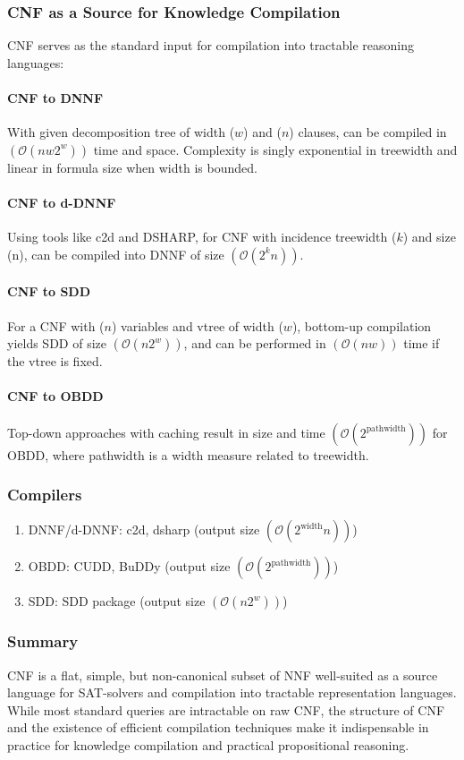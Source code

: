 \subsubsection{CNF as a Source for Knowledge Compilation}
CNF serves as the standard input for compilation into tractable reasoning languages:

\paragraph{CNF to DNNF}
With given decomposition tree of width ($w$) and ($n$) clauses, can be compiled in $(\mathcal{O}(nw2^w))$ time and space. Complexity is singly exponential in treewidth and linear in formula size when width is bounded.

\paragraph{CNF to d-DNNF}
Using tools like c2d and DSHARP, for CNF with incidence treewidth ($k$) and size (n), can be compiled into DNNF of size $(\mathcal{O}(2^k n))$.

\paragraph{CNF to SDD}
For a CNF with ($n$) variables and vtree of width ($w$), bottom-up compilation yields SDD of size $(\mathcal{O}(n2^{w}))$, and can be performed in $(\mathcal{O}(nw))$ time if the vtree is fixed.

\paragraph{CNF to OBDD}
Top-down approaches with caching result in size and time $(\mathcal{O}(2^{\text{pathwidth}}))$ for OBDD, where pathwidth is a width measure related to treewidth.

\subsubsection{Compilers}
\begin{enumerate}
    \item DNNF/d-DNNF: c2d, dsharp (output size $(\mathcal{O}(2^{\text{width}} n))$)
    \item OBDD: CUDD, BuDDy (output size $(\mathcal{O}(2^{\text{pathwidth}}))$)
    \item SDD: SDD package (output size $(\mathcal{O}(n2^{w}))$)
\end{enumerate}

\subsubsection{Summary}
CNF is a flat, simple, but non-canonical subset of NNF well-suited as a source language for SAT-solvers and compilation into tractable representation languages. While most standard queries are intractable on raw CNF, the structure of CNF and the existence of efficient compilation techniques make it indispensable in practice for knowledge compilation and practical propositional reasoning.